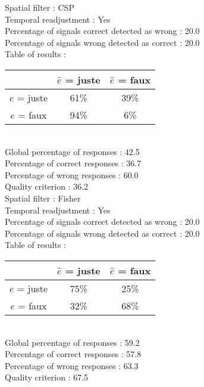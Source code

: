 Spatial filter : CSP \\
Temporal readjustment : Yes \\
Percentage of signals correct detected as wrong :   20.0 \\
Percentage of signals wrong detected as correct :   20.0 \\
Table of results : \\
\begin{tabular}{|c|c|c|}
\hline				& $\hat{e}$ = juste & $\hat{e}$ = faux \\
\hline  $e$ = juste	&     61\%			&     39\%		\\
\hline  $e$ = faux	&     94\%			&      6\%		\\
\hline
\end{tabular}\\
Global percentage of responses :   42.5 \\
Percentage of correct responses :   36.7 \\
Percentage of wrong responses :   60.0 \\
Quality criterion :   36.2 \\

Spatial filter : Fisher \\
Temporal readjustment : Yes \\
Percentage of signals correct detected as wrong :   20.0 \\
Percentage of signals wrong detected as correct :   20.0 \\
Table of results : \\
\begin{tabular}{|c|c|c|}
\hline				& $\hat{e}$ = juste & $\hat{e}$ = faux \\
\hline  $e$ = juste	&     75\%			&     25\%		\\
\hline  $e$ = faux	&     32\%			&     68\%		\\
\hline
\end{tabular}\\
Global percentage of responses :   59.2 \\
Percentage of correct responses :   57.8 \\
Percentage of wrong responses :   63.3 \\
Quality criterion :   67.5 \\

